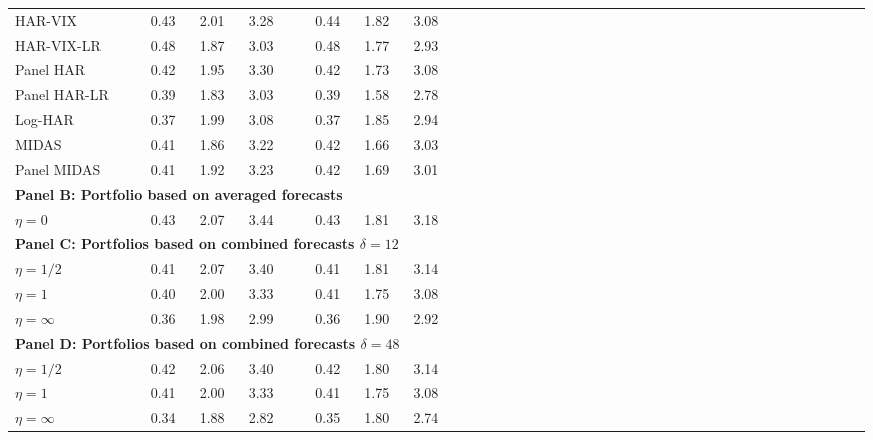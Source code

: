 \begin{tabular}{llllllllllllllllllllllllllllllllllllll}
HAR-VIX & 0.43 & 2.01 & 3.28 & & 0.44 & 1.82 & 3.08\\ 
HAR-VIX-LR & 0.48 & 1.87 & 3.03 & & 0.48 & 1.77 & 2.93\\ 
Panel HAR & 0.42 & 1.95 & 3.30 & & 0.42 & 1.73 & 3.08\\ 
Panel HAR-LR & 0.39 & 1.83 & 3.03 & & 0.39 & 1.58 & 2.78\\ 
\midrule 
Log-HAR & 0.37 & 1.99 & 3.08 & & 0.37 & 1.85 & 2.94\\ 
\midrule 
MIDAS & 0.41 & 1.86 & 3.22 & & 0.42 & 1.66 & 3.03\\ 
Panel MIDAS & 0.41 & 1.92 & 3.23 & & 0.42 & 1.69 & 3.01\\ 
\midrule 
\multicolumn{7}{l}{\textbf{Panel B: Portfolio based on averaged forecasts}} \\\midrule$\eta = 0$  & 0.43 & 2.07 & 3.44 & & 0.43 & 1.81 & 3.18\\ 
\midrule 
\multicolumn{7}{l}{\textbf{Panel C: Portfolios based on combined forecasts $\delta = 12$}} \\\midrule$\eta = 1/2$ & 0.41 & 2.07 & 3.40 & & 0.41 & 1.81 & 3.14\\ 
$\eta = 1$ & 0.40 & 2.00 & 3.33 & & 0.41 & 1.75 & 3.08\\ 
$\eta = \infty$ & 0.36 & 1.98 & 2.99 & & 0.36 & 1.90 & 2.92\\ 
\midrule 
\multicolumn{7}{l}{\textbf{Panel D: Portfolios based on combined forecasts $\delta = 48$}} \\\midrule$\eta = 1/2$ & 0.42 & 2.06 & 3.40 & & 0.42 & 1.80 & 3.14\\ 
$\eta = 1$ & 0.41 & 2.00 & 3.33 & & 0.41 & 1.75 & 3.08\\ 
$\eta = \infty$ & 0.34 & 1.88 & 2.82 & & 0.35 & 1.80 & 2.74\\ 
\bottomrule 
\end{tabular}